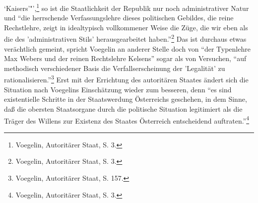 \documentclass[12pt,a4paper,ngerman]{article}
\begin{document}
`Kaisers'"',\footnote{Voegelin, Autoritärer Staat, S. 3.}  so ist die
Staatlichkeit der Republik nur noch administrativer Natur und "`die
herrschende Verfassungslehre dieses politischen Gebildes, die reine
Rechstlehre, zeigt in idealtypisch vollkommener Weise die Züge, die wir eben
als die des 'administrativen Stils' herausgearbeitet
haben."'\footnote{Voegelin, Autoritärer Staat, S. 3.}  Das ist durchaus etwas
verächtlich gemeint, spricht Voegelin an anderer Stelle doch von "`der
Typenlehre Max Webers und der reinen Rechtslehre Kelsens"' sogar als von
Versuchen, "`auf methodisch verschiedener Basis die Verfallserscheinung der
'Legalität' zu rationalisieren."'\footnote{Voegelin, Autoritärer Staat, S.
  157.}  Erst mit der Errichtung des autoritären Staates ändert sich die
Situation nach Voegelins Einschätzung wieder zum besseren, denn "`es sind
existentielle Schritte in der Staatswerdung Österreichs geschehen, in dem
Sinne, daß die obersten Staatsorgane durch die politische Situation
legitimiert als die Träger des Willens zur Existenz des Staates Österreich
entscheidend auftraten."'\footnote{Voegelin, Autoritärer Staat, S. 3.}
\end{document}
